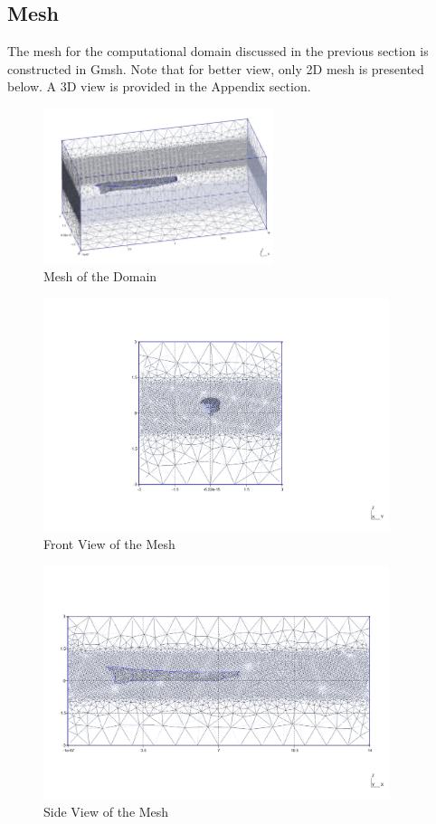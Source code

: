 \documentclass[12pt]{article} %
\begin{document}
\clearpage
\subsection{Mesh}
The mesh for the computational domain discussed in the previous section is constructed in Gmsh.
Note that for better view, only 2D mesh is presented below. A 3D view is provided in the Appendix 
section.
\begin{figure}[ht]
    \centering
    \includegraphics[width=0.6\textwidth]{Mesh_1.png}
    \caption{Mesh of the Domain}

\end{figure}
\begin{figure}[ht]
    \centering
    \includegraphics[width=0.9\textwidth]{Mesh_2.png}
    \caption{Front View of the Mesh}
\end{figure}

\begin{figure}[ht]
    \centering
    \includegraphics[width=0.9\textwidth]{Mesh_3.png}
    \caption{Side View of the Mesh}
\end{figure}
\end{document}
